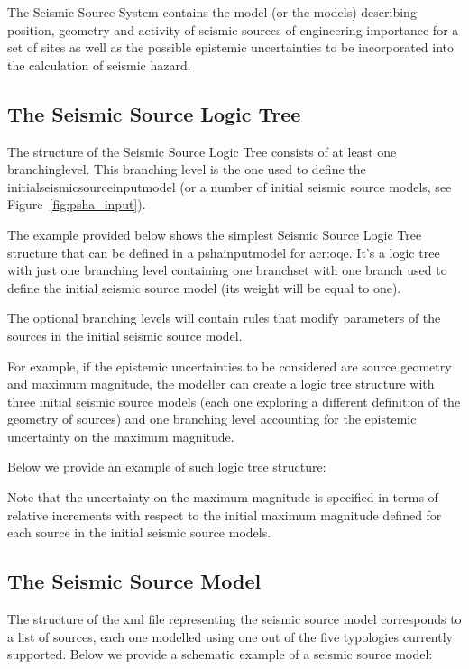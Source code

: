 The Seismic Source System contains the model (or the models) describing
position, geometry and activity of seismic sources of engineering importance
for a set of sites as well as the possible epistemic uncertainties to be
incorporated into the calculation of seismic hazard.



\subsection{The Seismic Source Logic Tree}

The structure of the Seismic Source Logic Tree consists of at least one
\gls{branchinglevel}. This branching level is the one used to define the
\gls{initialseismicsourceinputmodel} (or a number of initial seismic source
models, see Figure~\ref{fig:psha_input}).

The example provided below shows the simplest Seismic Source Logic Tree
structure that can be defined in a \gls{pshainputmodel} for \gls{acr:oqe}.
It's a logic tree with just one branching level containing one \gls{branchset}
with one branch used to define the initial seismic source model (its weight
will be equal to one). 

The optional branching levels will contain rules that modify parameters of the
sources in the initial seismic source model.

For example, if the epistemic uncertainties to be considered are source
geometry and maximum magnitude, the modeller can create a logic tree structure
with three initial seismic source models (each one exploring a different
definition of the geometry of sources) and one branching level accounting for
the epistemic uncertainty on the maximum magnitude.

Below we provide an example of such logic tree structure:



Note that the uncertainty on the maximum magnitude is specified in terms of
relative increments with respect to the initial maximum magnitude defined for
each source in the initial seismic source models.



\subsection{The Seismic Source Model}

The structure of the xml file representing the seismic source model
corresponds to a list of sources, each one modelled using one out of the five
typologies currently supported. Below we provide a schematic example of a
seismic source model:


